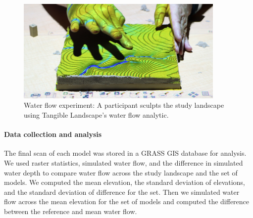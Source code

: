 \documentclass[prodmode,acmtochi]{acmsmall} %
\begin{document}
\begin{figure}
\begin{center}
	\includegraphics[width=0.9\textwidth]{images/experiments/tl_water.jpg}
	\caption{Water flow experiment: 
	A participant sculpts the study landscape using Tangible Landscape's water flow
	analytic.}
	\label{fig:flow_sequence}
\end{center}
\end{figure}

\paragraph{Data collection and analysis}
The final scan of each model was stored 
in a GRASS GIS database for analysis. 
We used raster statistics, simulated water flow, 
and the difference in simulated water depth 
to compare water flow across the study landscape and the set of models.
We computed the mean elevation,
the standard deviation of elevations, 
and the standard deviation of difference for the set.
Then we simulated water flow across the mean elevation for the set of models
and computed the difference between the reference and mean water flow. 
\end{document}
